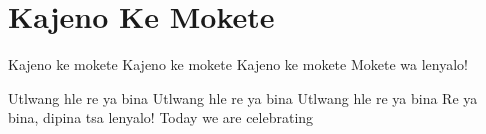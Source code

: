 \starttocol
\chapter{Kajeno Ke Mokete}
\nexttocol
\hfill{\it }
\stoptocol
\starttocol
\startlines
{\sc Kajeno} ke mokete
Kajeno ke mokete
Kajeno ke mokete
Mokete wa lenyalo!

Utlwang hle re ya bina
Utlwang hle re ya bina
Utlwang hle re ya bina
Re ya bina, dipina tsa lenyalo!
\stoplines
\nexttocol
Today we are celebrating
\stoptocol
